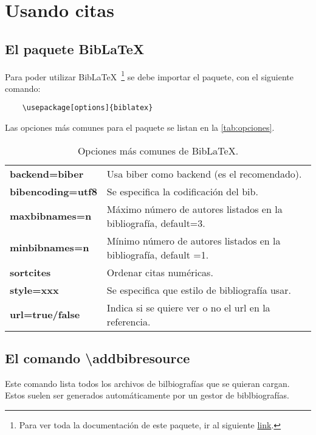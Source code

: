 \section{Usando citas}

\subsection{El paquete Bib\LaTeX}

Para poder utilizar Bib\LaTeX\ \footnote{Para ver toda la documentación de este paquete, ir al siguiente \hyperref{https://www.ctan.org/pkg/biblatex}{}{}{link}.} se debe importar el paquete, con el siguiente comando:
\begin{lstlisting}
	\usepackage[options]{biblatex}
\end{lstlisting}

Las opciones más comunes para el paquete se listan en la \autoref{tab:opciones}.

\begin{table}[htbp]
	\centering
	\caption{Opciones más comunes de Bib\LaTeX.}
	\begin{tabular}{ll}
		\toprule
		\textbf{backend=biber} & Usa biber como backend (es el recomendado). \\
		\textbf{bibencoding=utf8} & Se especifica la codificación del bib. \\
		\textbf{maxbibnames=n} & Máximo número de autores listados en la bibliografía, default=3. \\
		\textbf{minbibnames=n} & Mínimo número de autores listados en la bibliografía, default =1. \\
		\textbf{sortcites} & Ordenar citas numéricas. \\
		\textbf{style=xxx} & Se especifica que estilo de bibliografía usar. \\
		\textbf{url=true/false} & Indica si se quiere ver o no el url en la referencia. \\
		\bottomrule
	\end{tabular}%
	\label{tab:opciones}%
\end{table}%


\subsection{El comando \textbackslash addbibresource}

Este comando lista todos los archivos de bilbiografías que se quieran cargan. Estos suelen ser generados automáticamente por un gestor de biblbiografías.

